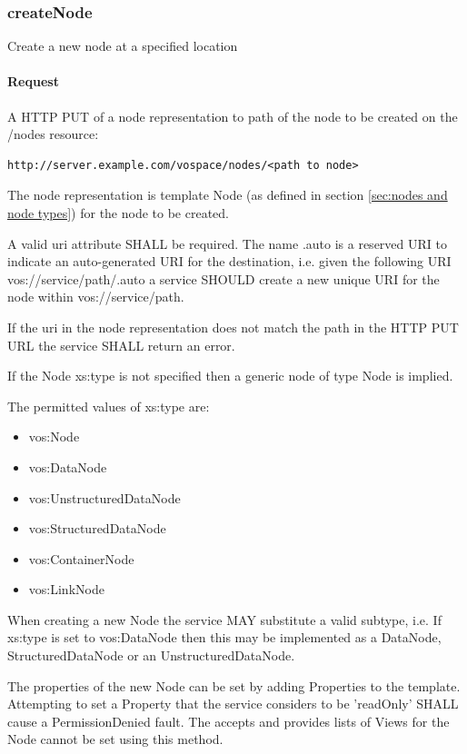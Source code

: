 \documentclass[11pt,a4paper]{ivoa}
\begin{document}
\subsubsection{createNode}
\label{subsubsec:createnode}
Create a new node at a specified location

\paragraph{Request}
A HTTP PUT of a node representation to path of the node to be created on the /nodes resource:
\begin{lstlisting}
http://server.example.com/vospace/nodes/<path to node>
\end{lstlisting}
The node representation is template Node (as defined in section \ref{sec:nodes and node types}) for the node to be created.

A valid uri attribute SHALL be required. The name .auto is a reserved URI to indicate an auto-generated URI for the destination, i.e. given the following URI vos://service/path/.auto a service SHOULD create a new unique URI for the node within vos://service/path.

If the uri in the node representation does not match the path in the HTTP PUT URL the service SHALL return an error.

If the Node xs:type is not specified then a generic node of type Node is implied.

The permitted values of xs:type are:

\begin{itemize}
    \item vos:Node
    \item vos:DataNode
    \item vos:UnstructuredDataNode
    \item vos:StructuredDataNode
    \item vos:ContainerNode
    \item vos:LinkNode
\end{itemize}

When creating a new Node the service MAY substitute a valid subtype, i.e. If xs:type is set to vos:DataNode then this may be implemented as a DataNode, StructuredDataNode or an UnstructuredDataNode.

The properties of the new Node can be set by adding Properties to the template. Attempting to set a Property that the service considers to be 'readOnly' SHALL cause a PermissionDenied fault. The accepts and provides lists of Views for the Node cannot be set using this method.
\end{document}
